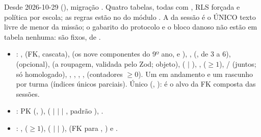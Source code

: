 Desde 2026-10-29 (), migração
. Quatro tabelas, todas
com  , RLS forçada e política por escola; as
regras estão no  do módulo . A
 da sessão é o ÚNICO texto livre de menor da missão; o gabarito
do protocolo e o bloco danoso não estão em tabela nenhuma: são fixos, de
.

\begin{itemize}
  \item {}: ,  (FK, cascata),
     (os nove componentes do 9º ano,  e
    ), ,  (, de 3 a 6),
     (opcional),  (a roupagem, validada pelo
    Zod; objeto),  ( $|$ ), ,
     ($\geq 1$), /
    (juntos;  só homologado), ,
    , , ,
     (contadores $\geq 0$). Um em andamento e um rascunho
    por turma (índices únicos parciais). Único (, ): é
    o alvo da FK composta das sessões.
  \item {}: PK (, ),
     ( $|$  $|$  $|$
    , padrão ), .
  \item {}: , 
    ($\geq 1$),  ( $|$  $|$
    ),  (FK para , ) e
    .
\end{itemize}

\subsection{}

